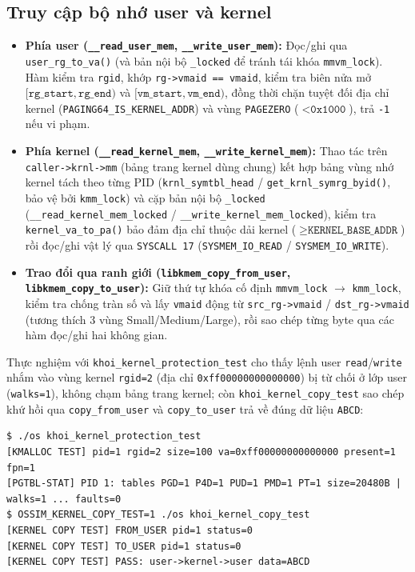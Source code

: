 \documentclass[12pt,a4paper]{article}
\begin{document}
	\subsection{Truy cập bộ nhớ user và kernel}
	\begin{itemize}[leftmargin=*]
		\item \textbf{Phía user (\texttt{\_\_read\_user\_mem}, \texttt{\_\_write\_user\_mem}):} Đọc/ghi qua \texttt{user\_rg\_to\_va()} (và bản nội bộ \texttt{\_locked} để tránh tái khóa \texttt{mmvm\_lock}). Hàm kiểm tra \texttt{rgid}, khớp \texttt{rg->vmaid == vmaid}, kiểm tra biên nửa mở $[\texttt{rg\_start}, \texttt{rg\_end})$ và $[\texttt{vm\_start}, \texttt{vm\_end})$, đồng thời chặn tuyệt đối địa chỉ kernel (\texttt{PAGING64\_IS\_\allowbreak KERNEL\_ADDR}) và vùng \texttt{PAGEZERO} ($< \texttt{0x1000}$), trả \texttt{-1} nếu vi phạm.
		\item \textbf{Phía kernel (\texttt{\_\_read\_kernel\_mem}, \texttt{\_\_write\_kernel\_mem}):} Thao tác trên \texttt{caller->krnl->mm} (bảng trang kernel dùng chung) kết hợp bảng vùng nhớ kernel tách theo từng PID (\texttt{krnl\_symtbl\_head} / \texttt{get\_krnl\_symrg\_byid()}, bảo vệ bởi \texttt{kmm\_lock}) và cặp bản nội bộ \texttt{\_locked} (\texttt{\_\_read\_kernel\_mem\_locked} / \texttt{\_\_write\_kernel\_mem\_locked}), kiểm tra \texttt{kernel\_va\_to\_pa()} bảo đảm địa chỉ thuộc dải kernel ($\ge \texttt{KERNEL\_BASE\_ADDR}$) rồi đọc/ghi vật lý qua \texttt{SYSCALL 17} (\texttt{SYSMEM\_IO\_READ} / \texttt{SYSMEM\_IO\_WRITE}).
		\item \textbf{Trao đổi qua ranh giới (\texttt{libkmem\_copy\_from\_user}, \texttt{libkmem\_copy\_to\_user}):} Giữ thứ tự khóa cố định \texttt{mmvm\_lock} $\to$ \texttt{kmm\_lock}, kiểm tra chống tràn số và lấy \texttt{vmaid} động từ \texttt{src\_rg->vmaid} / \texttt{dst\_rg->vmaid} (tương thích 3 vùng Small/Medium/Large), rồi sao chép từng byte qua các hàm đọc/ghi hai không gian.
	\end{itemize}

	Thực nghiệm với \texttt{khoi\_kernel\_protection\_test} cho thấy lệnh user \texttt{read}/\texttt{write} nhắm vào vùng kernel \texttt{rgid=2} (địa chỉ \texttt{0xff00000000000000}) bị từ chối ở lớp user (\texttt{walks=1}), không chạm bảng trang kernel; còn \texttt{khoi\_kernel\_copy\_test} sao chép khứ hồi qua \texttt{copy\_from\_user} và \texttt{copy\_to\_user} trả về đúng dữ liệu \texttt{ABCD}:

\begin{lstlisting}[caption={Output thực tế kiểm thử bảo vệ và copy user/kernel}]
$ ./os khoi_kernel_protection_test
[KMALLOC TEST] pid=1 rgid=2 size=100 va=0xff00000000000000 present=1 fpn=1
[PGTBL-STAT] PID 1: tables PGD=1 P4D=1 PUD=1 PMD=1 PT=1 size=20480B | walks=1 ... faults=0
$ OSSIM_KERNEL_COPY_TEST=1 ./os khoi_kernel_copy_test
[KERNEL COPY TEST] FROM_USER pid=1 status=0
[KERNEL COPY TEST] TO_USER pid=1 status=0
[KERNEL COPY TEST] PASS: user->kernel->user data=ABCD
\end{lstlisting}
\end{document}
